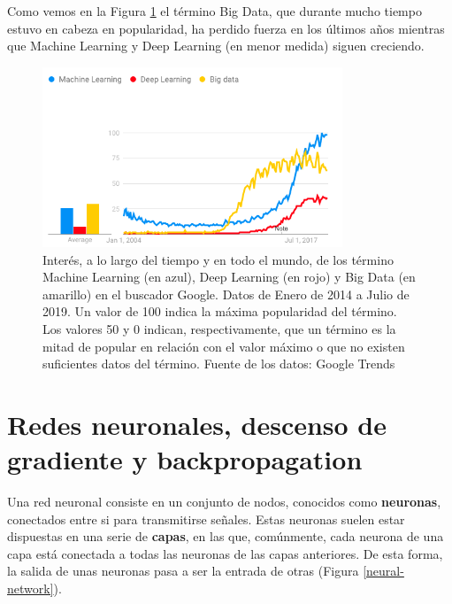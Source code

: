 \documentclass[
  12pt,
  spanish,
  a4paperpaper,
]{report}
\begin{document}
Como vemos en la Figura \ref{interes-ai} el término Big Data, que
durante mucho tiempo estuvo en cabeza en popularidad, ha perdido fuerza
en los últimos años mientras que Machine Learning y Deep Learning (en
menor medida) siguen creciendo.

\begin{figure}
\centering
\includegraphics[width=0.8\textwidth,height=\textheight]{source/figures/interes-ai.png}
\caption{Interés, a lo largo del tiempo y en todo el mundo, de los
término Machine Learning (en azul), Deep Learning (en rojo) y Big Data
(en amarillo) en el buscador Google. Datos de Enero de 2014 a Julio de
2019. Un valor de 100 indica la máxima popularidad del término. Los
valores 50 y 0 indican, respectivamente, que un término es la mitad de
popular en relación con el valor máximo o que no existen suficientes
datos del término. Fuente de los datos: Google Trends
\label{interes-ai}}
\end{figure}

\hypertarget{redes-neuronales-descenso-de-gradiente-y-backpropagation}{%
\section{Redes neuronales, descenso de gradiente y
backpropagation}\label{redes-neuronales-descenso-de-gradiente-y-backpropagation}}

Una red neuronal consiste en un conjunto de nodos, conocidos como
\textbf{neuronas}, conectados entre si para transmitirse señales. Estas
neuronas suelen estar dispuestas en una serie de \textbf{capas}, en las
que, comúnmente, cada neurona de una capa está conectada a todas las
neuronas de las capas anteriores. De esta forma, la salida de unas
neuronas pasa a ser la entrada de otras (Figura \ref{neural-network}).
\end{document}
